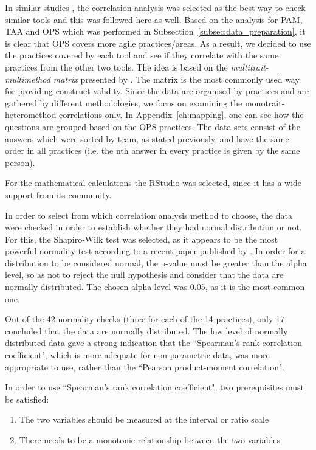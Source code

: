 In similar studies \cite{jalali_angelis,  Delestras2013}, the correlation analysis was selected as the best way to check similar tools and this was followed here as well. Based on the analysis for \ac{PAM}, \ac{TAA} and \ac{OPS} which was  performed in Subsection~\ref{subsec:data_preparation}, it is clear that \ac{OPS} covers more agile practices/areas. As a result, we decided to use the practices covered by each tool and see if they correlate with the same practices from the other two tools. The idea is based on the \textit{multitrait-multimethod matrix} presented by \citet{campbell1959}. The matrix is the most commonly used way for providing construct validity. Since the data are organised by practices and are gathered by different methodologies, we focus on examining the monotrait-heteromethod correlations only. In Appendix~\ref{ch:mapping}, one can see how the questions are grouped based on the \ac{OPS} practices. The data sets consist of the answers which were sorted by team, as stated previously, and have the same order in all practices (i.e. the nth answer in every practice is given by the same person).

For the mathematical calculations the RStudio\texttrademark \cite{rstudio} was selected, since it has a wide support from its community. 

In order to select from which correlation analysis method to choose, the data were checked in order to establish whether they had normal distribution or not. For this, the Shapiro-Wilk test was selected, as it appears to be the most powerful normality test according to a recent paper published by \citet{Razali}. In order for a distribution to be considered normal, the p-value must be greater than the alpha level, so as not to reject the null hypothesis and consider that the data are normally distributed. The chosen alpha level was 0.05, as it is the most common one.

Out of the 42 normality checks (three for each of the 14 practices), only 17 concluded that the data are normally distributed. The low level of normally distributed data gave a strong indication that the ``Spearman’s rank correlation coefficient", which is more adequate for non-parametric data, was more appropriate to use, rather than the ``Pearson product-moment correlation".

In order to use ``Spearman’s rank correlation coefficient", two prerequisites must be satisfied:
\begin{enumerate}
\item The two variables should be measured at the interval or ratio scale
\item There needs to be a monotonic relationship between the two variables
\end{enumerate}

